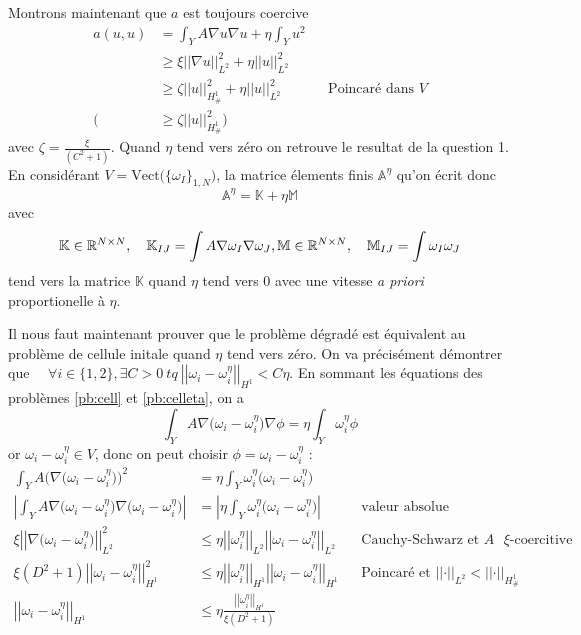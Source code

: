 \message{ !name(rapport.tex)}\documentclass[11pt]{article}
\newcommand{\Am}{\mathbb{A}}
\newcommand{\R}{\mathbb{R}}
\newcommand{\K}{\mathbb{K}}
\newcommand{\M}{\mathbb{M}}
\newcommand{\norm}[1]{\left|\left|#1\right|\right|}
\newcommand{\Hd}{H^1_{\#}}
\begin{document}
Montrons maintenant que $a$ est toujours coercive
\begin{align*}
  a(u,u) &= \int_Y A \nabla u  \nabla u + \eta \int_Y u^2 \\
         &\geq \xi \norm{\nabla u}^2_{L^2} + \eta \norm{u}^2_{L^2} \\
         &\geq \zeta \norm{u}^2_{\Hd} + \eta \norm{ u}^2_{L^2} && \text{Poincaré dans }V\\
    \big(&\geq \zeta  \norm{u}^2_{\Hd}\big)
\end{align*} 
avec $\zeta = \frac{\xi}{(C^2+1)}$. Quand $\eta$ tend vers zéro on retrouve le resultat de la question 1. En considérant $V = \text{Vect}\big(\{\omega_I\}_{1,N})$, la matrice élements finis $\Am^{\eta}$ qu'on écrit donc
\[
  \Am^{\eta} = \K + \eta \M 
\]
avec
\[
  \K \in \R^{N\times N},\quad \K_{IJ} = \int A \nabla \omega_I \nabla \omega_J,  \\
  \M \in \R^{N\times N},\quad \M_{IJ} = \int \omega_I \omega_J
\]
tend vers la matrice $\K$ quand $\eta$ tend vers $0$ avec une vitesse \emph{a priori} proportionelle à $\eta$.

Il nous faut maintenant prouver que le problème dégradé est équivalent au problème de cellule initale quand $\eta$ tend vers zéro. On va précisément démontrer
que $\quad\forall i \in \{1,2\}, \exists C>0 ~tq~ \norm{\omega_i-\omega_i^\eta}_{H^1} < C \eta$.
En sommant les équations des problèmes \autoref{pb:cell} et \autoref{pb:celleta}, on a
\[
  \int_Y A \nabla \big(\omega_i-\omega_i^\eta\big) \nabla \phi = \eta \int_Y \omega_i^\eta \phi
\]
or $\omega_i-\omega_i^\eta\in V$, donc on peut choisir $\phi=\omega_i-\omega_i^\eta$ :
\begin{align*}
  \int_Y A \big(\nabla \big(\omega_i-\omega_i^\eta\big)\big)^2
  &= \eta \int_Y \omega_i^\eta \big(\omega_i-\omega_i^\eta\big) \\
  \left| \int_Y A \nabla \big(\omega_i-\omega_i^\eta\big) \nabla \big(\omega_i-\omega_i^\eta\big) \right|
  &= \left| \eta \int_Y \omega_i^\eta \big(\omega_i-\omega_i^\eta\big) \right| && \text{valeur absolue} \\
  \xi \norm{\nabla \big(\omega_i-\omega_i^\eta \big)}_{L^2}^2
  &\leq \eta \norm{\omega_i^\eta}_{L^2} \norm{\omega_i-\omega_i^\eta}_{L^2} && \text{Cauchy-Schwarz et $A$ $\xi$-coercitive} \\
  \xi (D^2+1) \norm{\omega_i-\omega_i^\eta }_{H^1}^2 &\leq \eta \norm{\omega_i^\eta}_{H^1} \norm{\omega_i-\omega_i^\eta }_{H^1} && \text{Poincaré et }\norm{\cdot}_{L^2}<\norm{\cdot}_{\Hd} \\
  \norm{\omega_i-\omega_i^\eta }_{H^1} &\leq \eta \frac{\norm{\omega_i^\eta}_{H^1}}{\xi (D^2+1)}
\end{align*}
\end{document}
